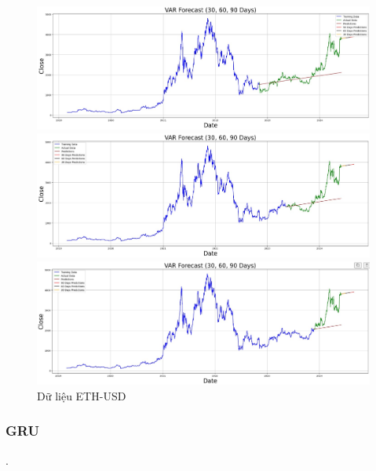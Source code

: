 \documentclass[conference]{IEEEtran}
\begin{document}
\begin{figure}[H]
    \centering
    \begin{minipage}{0.15\textwidth}
    \centering
    \includegraphics[width=1\textwidth]{Figure/VAR_ETH_7.jpg}
    \end{minipage}
    \hfill
    \begin{minipage}{0.15\textwidth}
    \centering
    \includegraphics[width=1\textwidth]{Figure/VAR_ETH_8.jpg}
    \end{minipage}
    \hfill
    \begin{minipage}{0.15\textwidth}
    \centering
    \includegraphics[width=1\textwidth]{Figure/VAR_ETH_9.jpg}
    \end{minipage}
    \caption{Dữ liệu ETH-USD}
    \label{fig:1}
\end{figure}

\subsubsection{GRU}.
\end{document}
